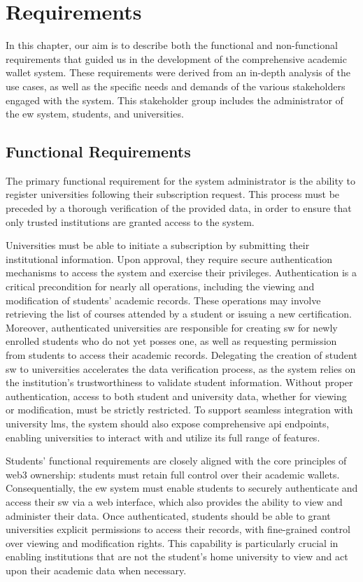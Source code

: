 \chapter{Requirements}
\label{chap:requirements}
In this chapter, our aim is to describe both the functional and non-functional requirements that guided us in the development of the comprehensive academic wallet system. These requirements were derived from an in-depth analysis of the use cases, as well as the specific needs and demands of the various stakeholders engaged with the system. This stakeholder group includes the administrator of the \acrfull{ew} system, students, and universities.

\section{Functional Requirements}
The primary functional requirement for the system administrator is the ability to register universities following their subscription request. This process must be preceded by a thorough verification of the provided data, in order to ensure that only trusted institutions are granted access to the system.

Universities must be able to initiate a subscription by submitting their institutional information. Upon approval, they require secure authentication mechanisms to access the system and exercise their privileges. Authentication is a critical precondition for nearly all operations, including the viewing and modification of students' academic records. These operations may involve retrieving the list of courses attended by a student or issuing a new certification. Moreover, authenticated universities are responsible for creating \acrfull{sw} for newly enrolled students who do not yet posses one, as well as requesting permission from students to access their academic records. Delegating the creation of student \acrshort{sw} to universities accelerates the data verification process, as the system relies on the institution's trustworthiness to validate student information. Without proper authentication, access to both student and university data, whether for viewing or modification, must be strictly restricted. To support seamless integration with university \acrfull{lms}, the system should also expose comprehensive \acrfull{api} endpoints, enabling universities to interact with and utilize its full range of features.

Students' functional requirements are closely aligned with the core principles of \Gls{web3} ownership: students must retain full control over their academic wallets. Consequentially, the \acrshort{ew} system must enable students to securely authenticate and access their \acrshort{sw} via a web interface, which also provides the ability to view and administer their data. Once authenticated, students should be able to grant universities explicit permissions to access their records, with fine-grained control over viewing and modification rights. This capability is particularly crucial in enabling institutions that are not the student's home university to view and act upon their academic data when necessary.

